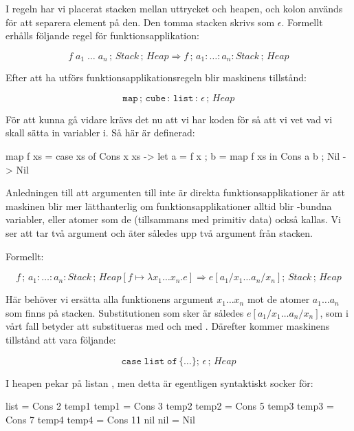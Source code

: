 \documentclass[../Core]{subfiles}
\begin{document}
I regeln har vi placerat stacken mellan uttrycket och heapen, och kolon används
för att separera element på den. Den tomma stacken skrivs som $\epsilon$.
Formellt erhålls följande regel för funktionsapplikation:

\[
f\; a_{1}\;\ldots\; a_{n}\,;\, Stack\,;\, Heap\Rightarrow f\,;\, a_{1}:\ldots:a_{n}:Stack\,;\, Heap\]


Efter att ha utförs funktionsapplikationsregeln blir maskinens tillstånd:

\[
\mathtt{map\,\mathrm{;}\, cube\,:\, list\,:\,\epsilon}\,;\, Heap\]

För att kunna gå vidare krävs det nu att vi har koden för  så att vi vet
vad vi skall sätta in variabler i. Så här är  definerad:


\begin{codeEx}
map f xs = case xs of
    { Cons x xs -> let { a = f x
                       ; b = map f xs
                       } in Cons a b
    ; Nil       -> Nil
    }
\end{codeEx}

Anledningen till att argumenten till  inte är direkta funktionsapplikationer
är att maskinen blir mer lätthanterlig om funktionsapplikationer alltid
blir -bundna variabler, eller atomer som de (tillsammans med primitiv data)
också kallas. Vi ser att  tar två argument och äter således upp två
argument från stacken.

Formellt:

\[
f\,;\, a_{1}:\ldots:a_{n}:Stack\,;\, Heap[f\mapsto\lambda x_{1}\ldots x_{n}.e]\Rightarrow e[a{}_{1}/x_{1}\ldots a_{n}/x_{n}];\, Stack\,;\, Heap\]


Här behöver vi ersätta alla funktionens argument $x_{1}\ldots x_{n}$ mot
de atomer $a_{1}\ldots a_{n}$ som finns på stacken. Substitutionen som sker är 
således $e[a{}_{1}/x_{1}\ldots a_{n}/x_{n}]$, som i vårt fall betyder att
 substitueras med  och  med . Därefter kommer maskinens tillstånd att vara följande:

\[
\mathtt{case\; list\; of\,\lbrace\ldots\rbrace};\,\epsilon\,;\, Heap\]


I heapen pekar  på listan \ic{[2,3,5,7,11]}, men detta är egentligen syntaktiskt socker
för:

\begin{codeEx}
list = Cons 2 temp1
temp1 = Cons 3 temp2
temp2 = Cons 5 temp3
temp3 = Cons 7 temp4
temp4 = Cons 11 nil
nil = Nil
\end{codeEx}
\end{document}
